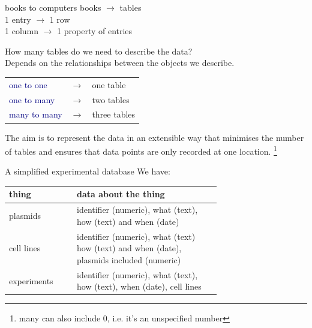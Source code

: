 \documentclass[pdf]{beamer}
\newcommand\blfootnote[1]{%
  \begingroup  %
  \renewcommand\thefootnote{}\footnote{#1}%
  \addtocounter{footnote}{-1}  %
  \endgroup
}
\begin{document}
\begin{frame}{books to computers}
  books $\rightarrow$ tables\\
  1 entry $\rightarrow$ 1 row\\
  1 column $\rightarrow$ 1 property of entries 

  \pause
  How many tables do we need to describe the data?\\
  Depends on the relationships between the objects we describe.

  \begin{tabular}{lcl}
    \textcolor{navy}{one to one} & $\rightarrow$  & one table\\
    \textcolor{navy}{one to many} & $\rightarrow$ & two tables\\
    \textcolor{navy}{many to many} & $\rightarrow$ & three tables \\
  \end{tabular}

  \pause
  The aim is to represent the data in an extensible way that minimises
  the number of tables and ensures that data points are only recorded
  at one location.
  \blfootnote{many can also include 0, i.e. it's an unspecified number}
\end{frame}

\begin{frame}{A simplified experimental database}
  We have:

  \begin{tabular}{p{0.2\linewidth}|p{0.5\linewidth}}
  thing & data about the thing \\
  \hline
  plasmids & identifier (numeric), what (text), how (text) and when (date) \\
  cell lines & identifier (numeric), what (text) how (text) and when (date), 
  plasmids included (numeric) \\
  experiments & identifier (numeric), what (text), how (text), when (date),
  cell lines\\
  \end{tabular}

\end{frame}
\end{document}
